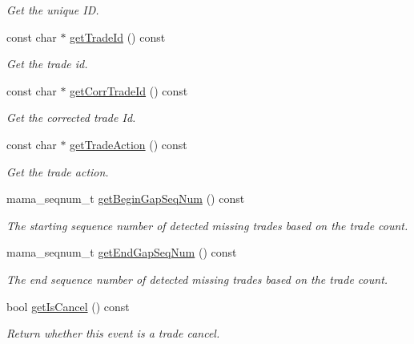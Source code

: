 \begin{CompactItemize}
\begin{CompactList}\small\item\em Get the unique ID. \item\end{CompactList}\item 
const char $\ast$ \hyperlink{classWombat_1_1MamdaTradeListener_4dcba79f4a1e795b26c382b80b6f18b5}{get\-Trade\-Id} () const 
\begin{CompactList}\small\item\em Get the trade id. \item\end{CompactList}\item 
const char $\ast$ \hyperlink{classWombat_1_1MamdaTradeListener_307d09719f4d878bdaeb211a6aa38465}{get\-Corr\-Trade\-Id} () const 
\begin{CompactList}\small\item\em Get the corrected trade Id. \item\end{CompactList}\item 
const char $\ast$ \hyperlink{classWombat_1_1MamdaTradeListener_9201b4749efd0f17dc42abf5c2bc2060}{get\-Trade\-Action} () const 
\begin{CompactList}\small\item\em Get the trade action. \item\end{CompactList}\item 
mama\_\-seqnum\_\-t \hyperlink{classWombat_1_1MamdaTradeListener_62f2fd151a022948527e1f6ed74ced3d}{get\-Begin\-Gap\-Seq\-Num} () const 
\begin{CompactList}\small\item\em The starting sequence number of detected missing trades based on the trade count. \item\end{CompactList}\item 
mama\_\-seqnum\_\-t \hyperlink{classWombat_1_1MamdaTradeListener_44737862aaa29034fd1b42173dae3a5d}{get\-End\-Gap\-Seq\-Num} () const 
\begin{CompactList}\small\item\em The end sequence number of detected missing trades based on the trade count. \item\end{CompactList}\item 
bool \hyperlink{classWombat_1_1MamdaTradeListener_d27b9e42599cbf198fbaf59df252a708}{get\-Is\-Cancel} () const 
\begin{CompactList}\small\item\em Return whether this event is a trade cancel. \item\end{CompactList}\item 

\end{CompactItemize}
